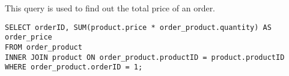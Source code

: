 This query is used to find out the total price of an order.

\begin{lstlisting}
SELECT orderID, SUM(product.price * order_product.quantity) AS order_price
FROM order_product
INNER JOIN product ON order_product.productID = product.productID
WHERE order_product.orderID = 1;
\end{lstlisting}